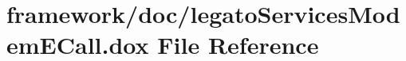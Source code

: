 \hypertarget{legato_services_modem_e_call_8dox}{}\section{framework/doc/legato\+Services\+Modem\+E\+Call.dox File Reference}
\label{legato_services_modem_e_call_8dox}

